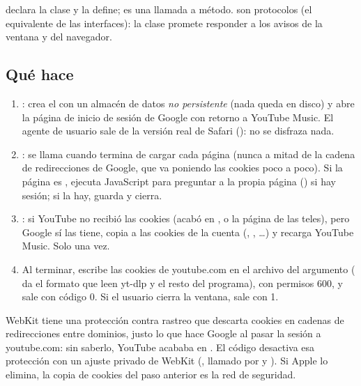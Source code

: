  declara la clase y  la define;  es
una llamada a método.  son protocolos (el equivalente de las
interfaces): la clase promete responder a los avisos de la ventana y del navegador.

\subsection{Qué hace}

\begin{enumerate}
  \item {}: crea el  con un almacén de datos \emph{no persistente}
  (nada queda en disco) y abre la página de inicio de sesión de Google con retorno a YouTube
  Music. El agente de usuario sale de la versión real de Safari (): no se
  disfraza nada.
  \item {}: se llama cuando termina de cargar cada página (nunca a mitad de la cadena
  de redirecciones de Google, que va poniendo las cookies poco a poco). Si la página es
  , ejecuta JavaScript para preguntar a la propia página
  () si hay sesión; si la hay, guarda y cierra.
  \item {}: si YouTube no recibió las cookies (acabó en , o
  la página de las teles), pero Google sí las tiene, copia a  las cookies de
  la cuenta (, , \dots) y recarga YouTube Music.
  Solo una vez.
  \item Al terminar, escribe las cookies de youtube.com en el archivo del argumento
  ( da el formato que leen yt-dlp y el resto del programa), con permisos
  600, y sale con código 0. Si el usuario cierra la ventana, sale con 1.
\end{enumerate}

\begin{trampa}
WebKit tiene una protección contra rastreo que descarta cookies en cadenas de redirecciones
entre dominios, justo lo que hace Google al pasar la sesión a youtube.com: sin saberlo,
YouTube acababa en . El código desactiva esa protección con un ajuste privado de
WebKit (, llamado por  y
). Si Apple lo elimina, la copia de cookies del paso anterior es la red de
seguridad.
\end{trampa}

